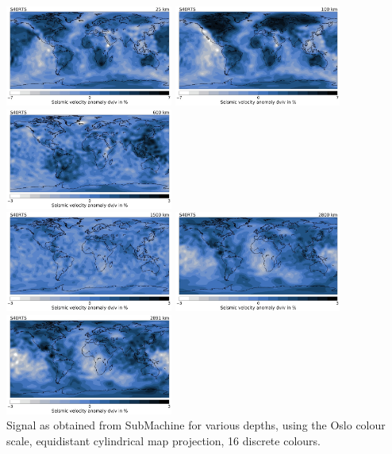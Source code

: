 \begin{center}
\includegraphics[width=5.5cm]{python_codes/fieldstone_85/images/submachine/submachine_S40RTS_25km_SMALL.jpg}
\includegraphics[width=5.5cm]{python_codes/fieldstone_85/images/submachine/submachine_S40RTS_100km_SMALL.jpg}
\includegraphics[width=5.5cm]{python_codes/fieldstone_85/images/submachine/submachine_S40RTS_600km_SMALL.jpg}\\
\includegraphics[width=5.5cm]{python_codes/fieldstone_85/images/submachine/submachine_S40RTS_1500km_SMALL.jpg}
\includegraphics[width=5.5cm]{python_codes/fieldstone_85/images/submachine/submachine_S40RTS_2800km_SMALL.jpg}
\includegraphics[width=5.5cm]{python_codes/fieldstone_85/images/submachine/submachine_S40RTS_2891km_SMALL.jpg}\\
{\captionfont Signal as obtained from SubMachine for various depths, using the Oslo colour scale, equidistant cylindrical map projection, 
16 discrete colours.}
\end{center}






